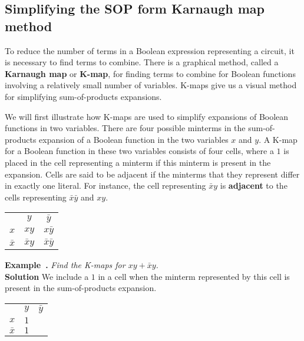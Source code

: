\documentclass{article}
\newcounter{example}
\newenvironment{example}[1][]{\refstepcounter{example}\par\medskip
\noindent\textbf{Example~\theexample. #1} \rmfamily}{\medskip}
\begin{document}
\subsection{\textbf{Simplifying the SOP form Karnaugh map method}}
 To reduce the number of terms in a Boolean expression representing a circuit, it is necessary
 to find terms to combine. There is a graphical method, called a \textbf{Karnaugh map} or \textbf{K-map}, for finding terms to combine for Boolean functions involving a relatively small number of variables. 
  K-maps give us a visual method for simplifying
 sum-of-products expansions.
 
 We will first
 illustrate how K-maps are used to simplify expansions of Boolean functions in two variables. There are four possible minterms in the sum-of-products expansion of a Boolean function
 in the two variables $x$ and $y$. A K-map for a Boolean function in these two variables consists of four cells, where a $1$ is placed in the cell representing a minterm if this minterm is present in the expansion. Cells are said to be adjacent if the minterms that they represent differ in exactly one literal. For instance, the cell representing $\bar x  y $ is \textbf{adjacent} to the cells representing $\bar x \bar y$ and $x y$. 
 
 \begin{center}
 \begin{tabular}{c|c|c}     \hline
\rowcolor{yellow} \multicolumn{3}{c}{K-map in two variables} \\ \hline
    \rowcolor{black!10} & $y$ & $\bar y$ \\ \hline
   \cellcolor{black!10}$x$      &  $xy$ & $x \bar y $ \\ \hline
   \cellcolor{black!10}$\bar x$ & $\bar x y$ & $\bar x \bar y $ \\ \hline
\end{tabular}
\end{center}
\begin{example}
    \textit{Find the K-maps for $xy + \bar x y$.}
    \\\textbf{Solution}  We include a $1$ in a cell when the minterm represented by this cell is present in the sum-of-products expansion. 
\begin{center}
    \begin{tabular}{c|c|c}  \hline
\rowcolor{yellow}    \multicolumn{3}{c}{K-map for $xy + \bar x y$} \\ \hline
   \rowcolor{black!10}  & $y$ & $\bar y$ \\ \hline
  \cellcolor{black!10} $x$      &  $1$ &  \\ \hline
   \cellcolor{black!10}$\bar x$ & $1$ &  \\ \hline
\end{tabular}
\end{center} 
\end{example}
\end{document}
